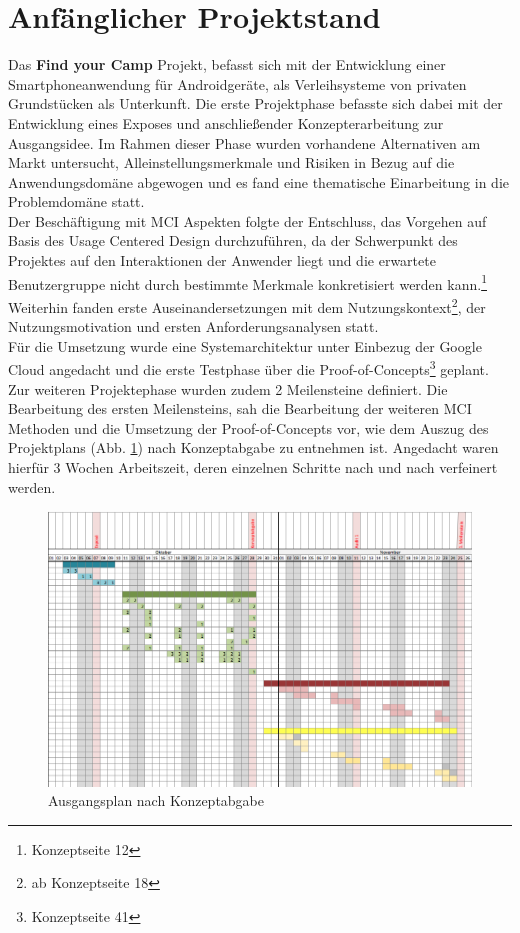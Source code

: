 
\section{Anfänglicher Projektstand}
Das \textbf{Find your Camp} Projekt, befasst sich mit der Entwicklung einer Smartphoneanwendung für Androidgeräte, als Verleihsysteme von privaten Grundstücken als Unterkunft. Die erste Projektphase befasste sich dabei mit der Entwicklung eines Exposes und anschließender Konzepterarbeitung zur Ausgangsidee. Im Rahmen dieser Phase wurden vorhandene Alternativen am Markt untersucht, Alleinstellungsmerkmale und Risiken in Bezug auf die Anwendungsdomäne abgewogen und es fand eine thematische Einarbeitung in die Problemdomäne statt.\\
Der Beschäftigung mit MCI Aspekten folgte der Entschluss, das Vorgehen auf Basis des Usage Centered Design durchzuführen, da der Schwerpunkt des Projektes auf den Interaktionen der Anwender liegt und die erwartete Benutzergruppe nicht durch bestimmte Merkmale konkretisiert werden kann.\footnote{Konzeptseite 12}
Weiterhin fanden erste Auseinandersetzungen mit dem Nutzungskontext\footnote{ab Konzeptseite 18}, der Nutzungsmotivation und ersten Anforderungsanalysen statt.\\
Für die Umsetzung wurde eine Systemarchitektur unter Einbezug der Google Cloud angedacht und die erste Testphase über die Proof-of-Concepts\footnote{Konzeptseite 41} geplant.\\

Zur weiteren Projektephase wurden zudem 2 Meilensteine definiert. Die Bearbeitung des ersten Meilensteins, sah die Bearbeitung der weiteren MCI Methoden und die Umsetzung der Proof-of-Concepts vor, wie dem Auszug des Projektplans (Abb. \ref{fig:projektplan}) nach Konzeptabgabe zu entnehmen ist.  Angedacht waren hierfür 3 Wochen Arbeitszeit, deren einzelnen Schritte nach und nach verfeinert werden.
\begin{figure}[H]
\includegraphics[width=1\textwidth]{./images/ausgangsplan.png}
\caption{Ausgangsplan nach Konzeptabgabe}
\label{fig:projektplan}
\end{figure}

